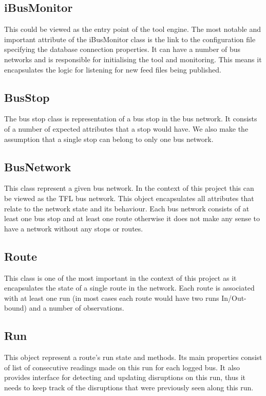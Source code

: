 \subsection{iBusMonitor}
This could be viewed as the entry point of the tool engine. The most notable and important attribute of the iBusMonitor class is the link to the configuration file specifying the database connection properties. It can have a number of bus networks and is responsible for initialising the tool and monitoring. This means it encapsulates the logic for listening for new feed files being published.

\subsection{BusStop}
The bus stop class is representation of a bus stop in the bus network. It consists of a number of expected attributes that a stop would have. We also make the assumption that a single stop can belong to only one bus network.

\subsection{BusNetwork}
This class represent a given bus network. In the context of this project this can be viewed as the TFL bus network. This object encapsulates all attributes that relate to the network state and its behaviour. Each bus network consists of at least one bus stop and at least one route otherwise it does not make any sense to have a network without any stops or routes.

\subsection{Route}
This class is one of the most important in the context of this project as it encapsulates the state of a single route in the network. Each route is associated with at least one run (in most cases each route would have two runs In/Out-bound) and a number of observations. 

\subsection{Run}
This object represent a route's run state and methods. Its main properties consist of list of consecutive readings made on this run for each logged bus. It also provides interface for detecting and updating disruptions on this run, thus it needs to keep track of the disruptions that were previously seen along this run.

